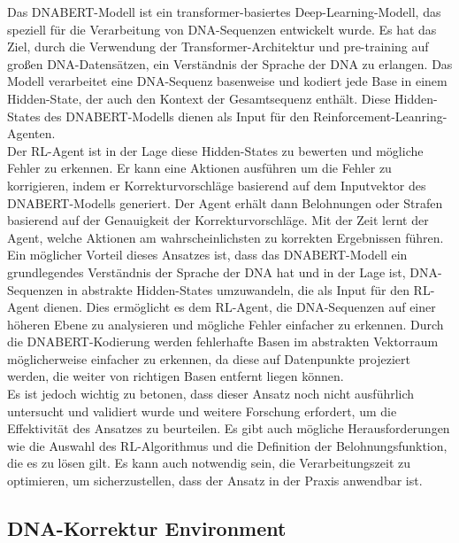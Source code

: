 \documentclass[oneside,bibliography=totocnumbered,BCOR=5mm]{scrbook}%
\theoremstyle{definition}
\theoremstyle{definition}
\theoremstyle{definition}
\theoremstyle{definition}
\theoremstyle{definition}
\theoremstyle{definition}
\begin{document}
Das DNABERT-Modell ist ein transformer-basiertes Deep-Learning-Modell, 
das speziell für die Verarbeitung von DNA-Sequenzen entwickelt wurde. 
Es hat das Ziel, durch die Verwendung der Transformer-Architektur und pre-training auf großen DNA-Datensätzen, 
ein Verständnis der Sprache der DNA zu erlangen. 
Das Modell verarbeitet eine DNA-Sequenz basenweise und kodiert jede Base in einem Hidden-State, 
der auch den Kontext der Gesamtsequenz enthält. 
Diese Hidden-States des DNABERT-Modells dienen als Input für den Reinforcement-Leanring-Agenten. \\


Der RL-Agent ist in der Lage diese Hidden-States zu bewerten und mögliche Fehler zu erkennen. 
Er kann eine Aktionen ausführen um die Fehler zu korrigieren, 
indem er Korrekturvorschläge basierend auf dem Inputvektor des DNABERT-Modells generiert. 
Der Agent erhält dann Belohnungen oder Strafen basierend auf der Genauigkeit der Korrekturvorschläge. 
Mit der Zeit lernt der Agent, welche Aktionen am wahrscheinlichsten zu korrekten Ergebnissen führen. \\


Ein möglicher Vorteil dieses Ansatzes ist, dass das DNABERT-Modell ein grundlegendes Verständnis der Sprache der DNA hat 
und in der Lage ist, DNA-Sequenzen in abstrakte Hidden-States umzuwandeln, die als Input für den RL-Agent dienen. 
Dies ermöglicht es dem RL-Agent, die DNA-Sequenzen auf einer höheren Ebene zu analysieren und mögliche Fehler 
einfacher zu erkennen. Durch die DNABERT-Kodierung werden fehlerhafte Basen im abstrakten Vektorraum
möglicherweise einfacher zu erkennen, da diese auf Datenpunkte projeziert werden, die weiter von
richtigen Basen entfernt liegen können. \\
 

Es ist jedoch wichtig zu betonen, dass dieser Ansatz noch nicht ausführlich untersucht und validiert wurde und 
weitere Forschung erfordert, um die Effektivität des Ansatzes zu beurteilen. 
Es gibt auch mögliche Herausforderungen wie die Auswahl des RL-Algorithmus und die Definition der Belohnungsfunktion, 
die es zu lösen gilt. 
Es kann auch notwendig sein, die Verarbeitungszeit zu optimieren, um sicherzustellen, dass der Ansatz in der Praxis anwendbar ist. \\


\subsection{DNA-Korrektur Environment}
\end{document}
